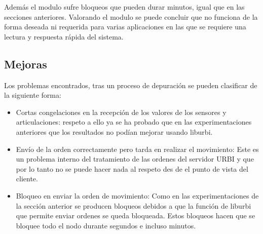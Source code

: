 \documentclass[12pt,a4paper,final,twoside]{book}
\begin{document}
Además el modulo sufre bloqueos que pueden durar minutos, igual que en las secciones anteriores.
Valorando el modulo se puede concluir que no funciona de la forma deseada ni requerida para varias aplicaciones en las que se requiere una lectura y respuesta rápida del sistema. 

\subsection{Mejoras}
Los problemas encontrados, tras un proceso de depuración se pueden clasificar de la siguiente forma:
\begin{itemize}
\item Cortas congelaciones en la recepción de los valores de los sensores y articulaciones: respeto a ello ya se ha probado que en las experimentaciones anteriores que los resultados no podían mejorar usando liburbi.
\item Envío de la orden correctamente pero tarda en realizar el movimiento: Este es un problema interno del tratamiento de las ordenes del servidor URBI y que por lo tanto no se puede hacer nada al respeto des de el punto de vista del cliente.
\item Bloqueo en enviar la orden de movimiento: Como en las experimentaciones de la sección anterior se producen bloqueos debidos a que la función de liburbi que permite enviar ordenes se queda bloqueada. Estos bloqueos hacen que se bloquee todo el nodo durante segundos e incluso minutos.
\end{itemize}
\end{document}
